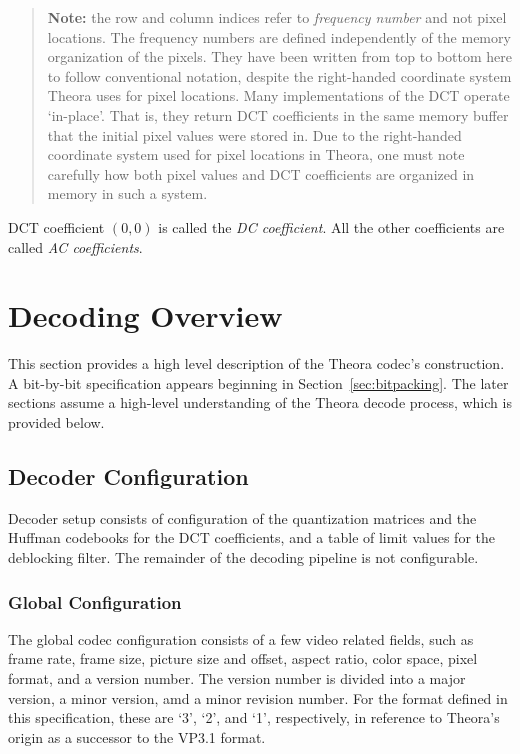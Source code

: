 \documentclass[9pt,letterpaper]{book}
\newcommand{\term}[1]{{\em #1}}
\numberwithin{equation}{chapter}
\numberwithin{figure}{chapter}
\numberwithin{table}{chapter}
\begin{document}
\begin{verse}
{\bf Note:} the row and column indices refer to {\em frequency number} and not
 pixel locations.
The frequency numbers are defined independently of the memory organization of
 the pixels.
They have been written from top to bottom here to follow conventional notation,
 despite the right-handed coordinate system Theora uses for pixel locations.
Many implementations of the DCT operate `in-place'.
That is, they return DCT coefficients in the same memory buffer that the
 initial pixel values were stored in.
Due to the right-handed coordinate system used for pixel locations in Theora,
 one must note carefully how both pixel values and DCT coefficients are
 organized in memory in such a system.
\end{verse}

DCT coefficient $(0,0)$ is called the \term{DC coefficient}.
All the other coefficients are called \term{AC coefficients}.


\chapter{Decoding Overview}

This section provides a high level description of the Theora codec's
 construction.
A bit-by-bit specification appears beginning in Section~\ref{sec:bitpacking}.
The later sections assume a high-level understanding of the Theora decode
 process, which is provided below.

\section{Decoder Configuration}

Decoder setup consists of configuration of the quantization matrices and the
 Huffman codebooks for the DCT coefficients, and a table of limit values for
 the deblocking filter.
The remainder of the decoding pipeline is not configurable.

\subsection{Global Configuration}

The global codec configuration consists of a few video related fields, such as
 frame rate, frame size, picture size and offset, aspect ratio, color space,
 pixel format, and a version number.
The version number is divided into a major version, a minor version, amd a
 minor revision number.
For the format defined in this specification, these are `3', `2', and
 `1', respectively, in reference to Theora's origin as a successor to 
 the VP3.1 format.
\end{document}
